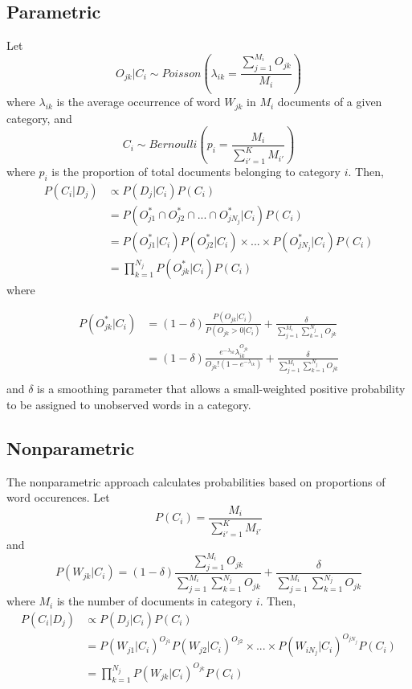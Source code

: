 \documentclass[a4paper]{article}
\begin{document}
\subsection*{Parametric}
Let 
$$O_{jk}|C_i \sim Poisson(\lambda_{ik} = \frac{\sum_{j=1}^{M_i} O_{jk}}{M_i} )$$
where $\lambda_{ik}$ is the average occurrence of word $W_{jk}$ in $M_i$ documents of a given category, and
$$C_i \sim Bernoulli(p_i = \frac{M_i}{\sum_{i'=1}^K M_{i'}})$$
where $p_i$ is the proportion of total documents belonging to category $i$. Then, \\

\begin{align*}
P(C_i | D_j) & \propto P(D_j | C_i)P(C_i) \\
& = P(O_{j1}^* \cap O_{j2}^* \cap ... \cap O_{jN_j}^* | C_i)P(C_i) \\
& = P(O_{j1}^*|C_i)P(O_{j2}^*|C_i) \times ... \times P(O_{jN_j}^*|C_i) P(C_i) \\
& = \prod_{k=1}^{N_j} P(O_{jk}^*|C_i) P(C_i) 
\end{align*}
where 

\begin{align*}
P(O_{jk}^*|C_i) & = (1-\delta)\frac{P(O_{jk}|C_i)}{P(O_{jk} > 0|C_i)} +  \frac{\delta}{\sum_{j=1}^{M_i} \sum_{k=1}^{N_j} O_{jk}} \\
 & = (1-\delta)\frac{e^{-\lambda_{ik}}\lambda_{ik}^{O_{jk}}}{O_{jk}!(1-e^{-\lambda_{ik}})} +  \frac{\delta}{\sum_{j=1}^{M_i} \sum_{k=1}^{N_j} O_{jk}} \\
\end{align*}
and $\delta$ is a smoothing parameter that allows a small-weighted positive probability to be assigned to unobserved words in a category.


\subsection*{Nonparametric}
The nonparametric approach calculates probabilities based on proportions of word occurences. Let
$$P(C_i) = \frac{M_i}{\sum_{i'=1}^K M_{i'}}$$
and 
$$P(W_{jk} | C_i) = (1-\delta)\frac{\sum_{j=1}^{M_i} O_{jk}}{\sum_{j=1}^{M_i} \sum_{k=1}^{N_j} O_{jk}} +  \frac{\delta}{\sum_{j=1}^{M_i} \sum_{k=1}^{N_j} O_{jk}}$$ 
where $M_i$ is the number of documents in category $i$. Then,
\begin{align*}
P(C_i | D_j) & \propto P(D_j | C_i)P(C_i) \\
& = P(W_{j1}|C_i)^{O_{j1}}P(W_{j2}|C_i)^{O_{j2}} \times ... \times P(W_{iN_j}|C_i)^{O_{jN_j}} P(C_i) \\
& = \prod_{k=1}^{N_j} P(W_{jk}|C_i)^{O_{jk}} P(C_i) \\ 
\end{align*}
\end{document}
